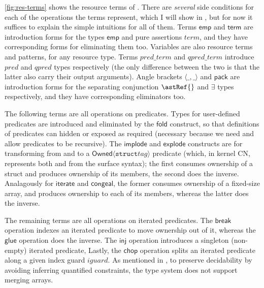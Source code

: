 \cref{fig:res-terms} shows the resource terms of . There are
\emph{several} side conditions for each of the operations the terms represent,
which I will show in , but for now it suffices to
explain the simple intuitions for all of them. Terms $\mathsf{emp}$ and
$\mathsf{term}$ are introduction forms for the types $\mathsf{emp}$ and pure
assertions $\mathit{term}$, and they have corresponding forms for eliminating
them too. Variables are also resource terms and patterns, for any resource
type. Terms $\mathit{pred\_term}$ and $\mathit{qpred\_term}$ introduce
$\mathit{pred}$ and $\mathit{qpred}$ types respectively (the only difference
between the two is that the latter also carry their output arguments). Angle
brackets $\langle \_ , \_ \rangle$ and $\mathsf{pack}$ are introduction forms
for the separating conjunction $\astRef{}$ and $\exists$ types respectively,
and they have corresponding eliminators too.

The following terms are all operations on predicates. Types for
user-defined predicates are introduced and eliminated by the $\mathsf{fold}$
construct, so that definitions of predicates can hidden or exposed as required
(necessary because we need and allow predicates to be recursive). The
$\mathsf{implode}$ and $\mathsf{explode}$ constructs are for transforming from
and to a $\mathsf{Owned}\langle \mathtt{struct} \mathit{tag} \rangle$ predicate
(which, in kernel CN, represents both  and
 from the surface syntax); the first consumes ownership of
a struct and produces ownership of its members, the second does the inverse.
Analagously for $\mathsf{iterate}$ and $\mathsf{congeal}$, the former consumes
ownership of a fixed-size array, and produces ownership to each of its members,
whereas the latter does the inverse.

The remaining terms are all operations on iterated predicates. The $\mathsf{break}$
operation indexes an iterated predicate to move ownership out of it, whereas
the $\mathsf{glue}$ operation does the inverse. The $\mathsf{inj}$ operation
introduces a singleton (non-empty) iterated predicate,
Lastly, the $\mathsf{chop}$ operation splits an iterated predicate along a given
index guard $\mathit{iguard}$. As mentioned in , to
preserve decidability by avoiding inferring quantified constraints, the type
system does not support merging arrays.

